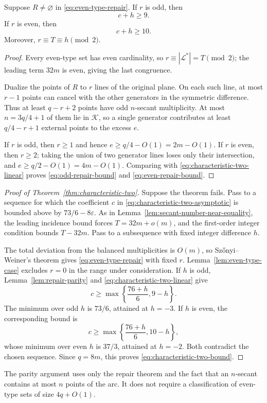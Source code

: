 \begin{lemma}\label{lem:repair-parity}
Suppose \(R\ne\varnothing\) in \eqref{eq:even-type-repair}.  If \(r\) is
odd, then
\begin{equation}\label{eq:odd-repair-bound}
 c+h\ge9.
\end{equation}
If \(r\) is even, then
\begin{equation}\label{eq:even-repair-bound}
 c+h\ge10.
\end{equation}
Moreover, \(r\equiv T\equiv h\pmod2\).
\end{lemma}

\begin{proof}
Every even-type set has even cardinality, so
\(r\equiv|\mathcal L^*|=T\pmod2\); the leading term \(32m\) is even, giving
the last congruence.

Dualize the points of \(R\) to \(r\) lines of the original plane.  On each
such line, at most \(r-1\) points can cancel with the other generators in the
symmetric difference.  Thus at least \(q-r+2\) points have odd
\(n\)-secant multiplicity.  At most \(n=3q/4+1\) of them lie in
\(\mathcal K\), so a single generator contributes at least
\(q/4-r+1\) external points to the excess \(e\).

If \(r\) is odd, then \(r\ge1\) and hence \(e\ge q/4-O(1)=2m-O(1)\).
If \(r\) is even, then \(r\ge2\); taking the union of two generator lines
loses only their intersection, and \(e\ge q/2-O(1)=4m-O(1)\).  Comparing
with \eqref{eq:characteristic-two-linear} proves
\eqref{eq:odd-repair-bound} and \eqref{eq:even-repair-bound}.
\end{proof}

\begin{proof}[Proof of Theorem~\ref{thm:characteristic-two}]
Suppose the theorem fails.  Pass to a sequence for which the coefficient
\(c\) in \eqref{eq:characteristic-two-asymptotic} is bounded above by
\(73/6-8\varepsilon\).  As in
Lemma~\ref{lem:secant-number-near-equality}, the leading incidence bound
forces \(T=32m+o(m)\), and the first-order integer condition bounds
\(T-32m\).  Pass to a subsequence with fixed integer difference \(h\).

The total deviation from the balanced multiplicities is \(O(m)\), so
Sz\H{o}nyi--Weiner's theorem gives \eqref{eq:even-type-repair} with fixed \(r\).
Lemma~\ref{lem:even-type-case} excludes \(r=0\) in the range under
consideration.  If \(h\) is odd, Lemma~\ref{lem:repair-parity} and
\eqref{eq:characteristic-two-linear} give
\[
 c\ge\max\left\{\frac{76+h}{6},9-h\right\}.
\]
The minimum over odd \(h\) is \(73/6\), attained at \(h=-3\).  If \(h\) is
even, the corresponding bound is
\[
 c\ge\max\left\{\frac{76+h}{6},10-h\right\},
\]
whose minimum over even \(h\) is \(37/3\), attained at \(h=-2\).  Both
contradict the chosen sequence.  Since \(q=8m\), this proves
\eqref{eq:characteristic-two-bound}.
\end{proof}

The parity argument uses only the repair theorem and the fact that an
\(n\)-secant contains at most \(n\) points of the arc.  It does not require a
classification of even-type sets of size \(4q+O(1)\).
